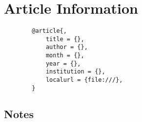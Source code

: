 \documentclass[10pt]{article}
\begin{document}
\section*{Article Information}

	\begin{framed}
		\begin{verbatim}
		@article{,
			title = {},
			author = {},
			month = {},
			year = {},
			institution = {},
			localurl = {file:///},
		}
		\end{verbatim}
	\end{framed}


\begin{multicols}{2}

\section*{Notes}



\nocite{*}


\end{multicols}
\end{document}
